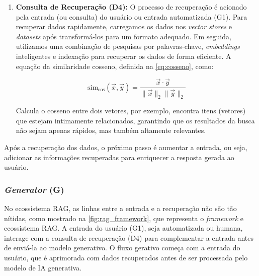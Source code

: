 \documentclass[a4paper, 12pt]{article}
\begin{document}
\begin{enumerate}
        \item \textbf{Consulta de Recuperação (D4):} \label{sec:recovery} O processo de recuperação é acionado pela entrada (ou consulta) do usuário ou entrada automatizada (G1). Para recuperar dados rapidamente, carregamos os dados nos \textit{vector stores} e \textit{datasets} após transformá-los para um formato adequado. Em seguida, utilizamos uma combinação de pesquisas por palavras-chave, \textit{embeddings} inteligentes e indexação para recuperar os dados de forma eficiente.
        A equação da similaridade cosseno, definida na \autoref{eq:cosseno}, como: 
        
        \begin{equation}
            \text{sim}_{\cos}(\vec{x}, \vec{y}) = \frac{\vec{x} \cdot \vec{y}}{\|\vec{x}\|_2 \|\vec{y}\|_2}
            \label{eq:cosseno}
        \end{equation}
        
        Calcula o cosseno entre dois vetores, por exemplo, encontra itens (vetores) que estejam intimamente relacionados, garantindo que os resultados da busca não sejam apenas rápidos, mas também altamente relevantes.
    \end{enumerate}

    Após a recuperação dos dados, o próximo passo é aumentar a entrada, ou seja, adicionar as informações recuperadas para enriquecer a resposta gerada ao usuário.

    \subsubsection{\textit{Generator} (G)}

    No ecossistema RAG, as linhas entre a entrada e a recuperação não são tão nítidas, como mostrado na \autoref{fig:rag_framework}, que representa o \textit{framework} e ecossistema RAG. A entrada do usuário (G1), seja automatizada ou humana, interage com a consulta de recuperação (D4) para complementar a entrada antes de enviá-la ao modelo generativo. O fluxo gerativo começa com a entrada do usuário, que é aprimorada com dados recuperados antes de ser processada pelo modelo de IA generativa.
\end{document}
